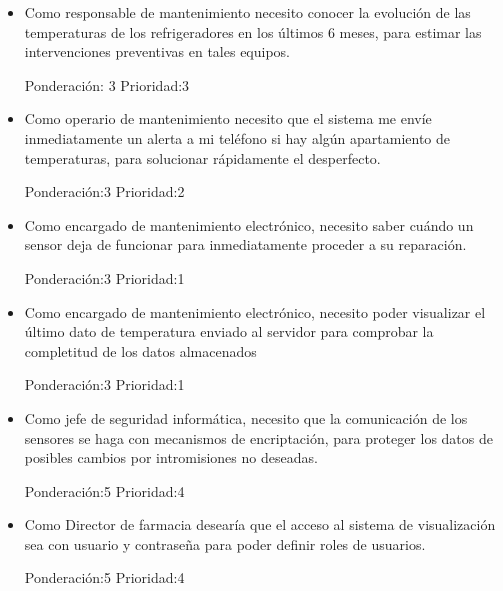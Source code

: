 \documentclass[11pt]{proyecto}
\begin{document}
\begin{itemize}
\item Como responsable de mantenimiento necesito conocer la evolución de las temperaturas de los refrigeradores en los últimos 6 meses, para estimar las intervenciones preventivas en tales equipos. 

Ponderación: 3 Prioridad:3
\end{itemize}


\begin{itemize}
\item Como operario de mantenimiento necesito que el sistema me envíe inmediatamente un alerta a mi teléfono si hay algún apartamiento de temperaturas, para solucionar rápidamente el desperfecto. 

Ponderación:3 Prioridad:2
\end{itemize}


\begin{itemize}
\item Como encargado de mantenimiento electrónico, necesito saber cuándo un sensor deja de funcionar para inmediatamente proceder a su reparación. 

Ponderación:3 Prioridad:1
\end{itemize}

\begin{itemize}
\item Como encargado de mantenimiento electrónico, necesito poder visualizar el último dato de temperatura enviado al servidor para comprobar la completitud de los datos almacenados

Ponderación:3 Prioridad:1
\end{itemize}


\begin{itemize}
\item Como jefe de seguridad informática, necesito que la comunicación de los sensores se haga con mecanismos de encriptación, para proteger los datos de posibles cambios por intromisiones no deseadas. 

Ponderación:5 Prioridad:4
\end{itemize}


\begin{itemize}
\item Como Director de farmacia desearía que el acceso al sistema de visualización sea con usuario y contraseña para poder definir roles de usuarios. 

Ponderación:5 Prioridad:4
\end{itemize}
\end{document}
